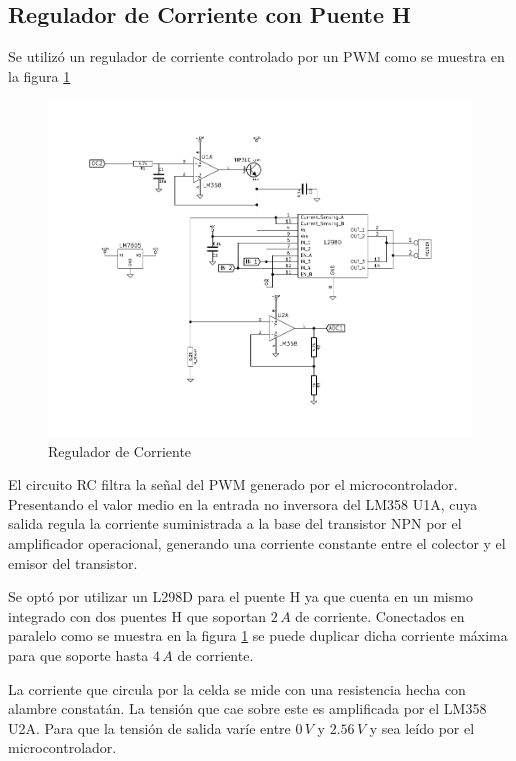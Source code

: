 \documentclass[10pt,spanish,a4paper,openany,notitlepage]{article}
\begin{document}
\subsection{Regulador de Corriente con Puente H}

Se utilizó un regulador de corriente controlado por un PWM como se muestra
en la figura \ref{fig:reg_corriente}

\begin{figure}[H] %
\begin{center}
\includegraphics[scale=1]{../circuitos/regulador_corriente.pdf}
\caption{Regulador de Corriente}
 \label{fig:reg_corriente}
\end{center}
\end{figure}

El circuito RC filtra la señal del PWM generado por el
microcontrolador. Presentando el valor medio en la entrada no inversora del LM358 U1A,
cuya salida regula la corriente suministrada a la
base del transistor NPN por el amplificador operacional, generando una corriente
constante entre el colector y el emisor del transistor.

Se optó por utilizar un L298D para el puente H ya que cuenta en un mismo
integrado con dos puentes H que soportan $2\, \unit{A}$ de corriente. 
Conectados en paralelo como se muestra en la figura \ref{fig:reg_corriente} 
se puede duplicar dicha corriente máxima para que soporte hasta $4\, \unit{A}$ de corriente.

La corriente que circula por la celda se mide con una resistencia hecha con
alambre constatán. La tensión que cae sobre este es amplificada por el LM358 U2A.
Para que la tensión de salida varíe entre $0\, \unit{V}$ y $2.56\, \unit{V}$
y sea leído por el microcontrolador.
\end{document}
